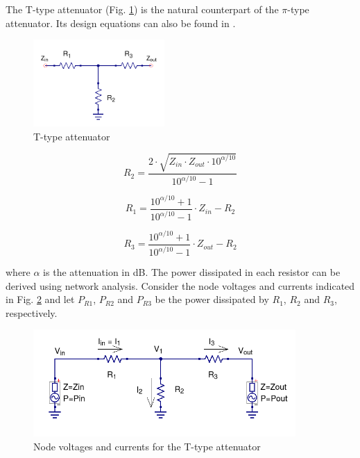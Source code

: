 \noindent The T-type attenuator (Fig. \ref{fig:tee-type-attenuator-schematic}) is the natural counterpart of the $\pi$-type attenuator. Its design equations can also be found in \cite{vizmuller1995rf}.


  \begin{figure}[ht]
    \centering
    \includegraphics[width=5cm]{./images/tee-attenuator-schematic.png}
    \caption{T-type attenuator}
    \label{fig:tee-type-attenuator-schematic}
  \end{figure}
  
  \begin{equation}
  	R_{2} = \frac{2 \cdot \sqrt{Z_{in} \cdot Z_{out} \cdot 10^{\alpha/10}}}{10^{\alpha/10}-1}
  \end{equation}  
  
  \begin{equation}
  	R_{1} = \frac{10^{\alpha/10} + 1}{10^{\alpha/10} - 1} \cdot Z_{in} - R_2
  \end{equation}
  
    \begin{equation}
  	R_{3} = \frac{10^{\alpha/10} + 1}{10^{\alpha/10} - 1} \cdot Z_{out} - R_2
  \end{equation}
  
  
\noindent where $\alpha$ is the attenuation in dB. The power dissipated in each resistor can be derived using network analysis. Consider the node voltages and currents indicated in Fig. \ref{fig:power-dissipation-tee-type-attenuator} and let $P_{R1}$, $P_{R2}$ and $P_{R3}$ be the power dissipated by $R_1$, $R_2$ and $R_3$, respectively.

  \begin{figure}[ht]
    \centering
    \includegraphics[width=10cm]{./images/tee-attenuator-power-dissipation.png}
    \caption{Node voltages and currents for the T-type attenuator}
    \label{fig:power-dissipation-tee-type-attenuator}
  \end{figure}
  
